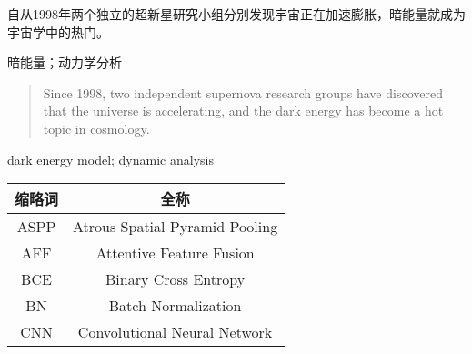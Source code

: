 

\begin{zhaiyao}
自从1998年两个独立的超新星研究小组分别发现宇宙正在加速膨胀，暗能量就成为宇宙学中的热门。
\end{zhaiyao}




\begin{guanjianci}
暗能量；动力学分析
\end{guanjianci}



\begin{abstract}
Since 1998, two independent supernova research groups have discovered that the universe is accelerating, and the dark energy has become a hot topic in cosmology. 

\end{abstract}



\begin{keywords}
dark energy model; dynamic analysis
\end{keywords} 


\tableofcontents

\begin{symbList}

\begin{table*}[!h]
  \centering
  \renewcommand{\arraystretch}{1.2}
  \renewcommand{\tabcolsep}{5.mm}
  \label{tab:suolveci}
  \begin{tabular}{cc} \hline
    缩略词 & 全称 \\ \hline
    ASPP & Atrous Spatial Pyramid Pooling \\
    AFF & Attentive Feature Fusion \\
    BCE & Binary Cross Entropy \\
    BN & Batch Normalization \\
    CNN & Convolutional Neural Network \\
    \hline
  \end{tabular}
\end{table*}

\end{symbList}